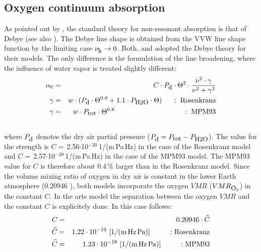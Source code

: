 \subsection{Oxygen continuum absorption}
\label{levelc:o2cont}
As pointed out by \citet{vv:87}, the standard theory for
non-resonant absorption is that of Debye (see also \citet{townes:55}). 
The Debye line shape is obtained from the VVW line shape function 
by the limiting case $\nu_{\mbox{\rm \small k}} \rightarrow 0$.
Both, \citet{liebeetal:93} and \citet{pwr:93} adopted the
Debye theory for their models. The only difference is the formulation
of the line broadening, where the influence of water vapor is treated 
slightly different: 
\begin{eqnarray}
  \label{eq:abs_theory:abs_cont_pwr_o2}
  \alphac &=&  C \cdot \pda \cdot \Theta^2 \cdot 
             \frac{\nu^2 \cdot \gamma}{\nu^2+\gamma^2}\\
  \label{eq:abs_theory:abs_cont_pwr_o2_1}
  \gamma &=&  w \cdot (\pda\cdot \Theta^{0.8} + 1.1 \cdot \phzo \cdot
  \Theta)\hspace*{5mm}:~\mbox{Rosenkranz}\\
  \label{eq:abs_theory:abs_cont_pwr_o2_2}
  \gamma &=&  w \cdot \ptot \cdot \Theta^{0.8}\hspace*{34mm}:~\mbox{MPM93}\\
\nonumber
\end{eqnarray}
where $P_{\mbox{\rm \small d}}$ denotes the dry air partial pressure ($P_{\mbox{\rm \small d}}=P_{\mbox{\rm \small tot}}-P_{\mbox{\rm \small H2O}}$). 
The value for the strength is $C =$\,2.56$\cdot$10$^{-20}$\,1/(m\,Pa\,Hz) 
in the case of the Rosenkranz model and 
$C =$\,2.57$\cdot$10$^{-20}$\,1/(m\,Pa\,Hz) in the case of the MPM93 model.
The MPM93 value for $C$ is therefore about 0.4\,\% larger than in the 
Rosenkranz model. Since the volume mixing ratio of oxygen in dry air
is constant in the lower Earth atmosphere (0.20946 \citep{goody:95}), 
both models incorporate the oxygen $VMR$ ($VMR_{\mbox{\rm \small O}_{2}}$) in the 
constant $C$. In the arts model the separation between the oxygen
$VMR$ and the constant $C$ is explicitely done. In this case follows:
\begin{eqnarray} 
 \label{eq:abs_theory:o2cont_const_vmr_1}
 C &=& 0.20946 \cdot \widehat{C}\\
 \label{eq:abs_theory:o2cont_const_vmr_2}
 \widehat{C} &=& 1.22\cdot 10^{-19}~\mbox{[1/(m\,Hz\,Pa)]\hspace{10mm}:~Rosenkranz} \\
 \label{eq:abs_theory:o2cont_const_vmr_3}
 \widehat{C} &=& 1.23\cdot 10^{-19}~\mbox{[1/(m\,Hz\,Pa)]\hspace{10mm}:~MPM93} 
\end{eqnarray} 
